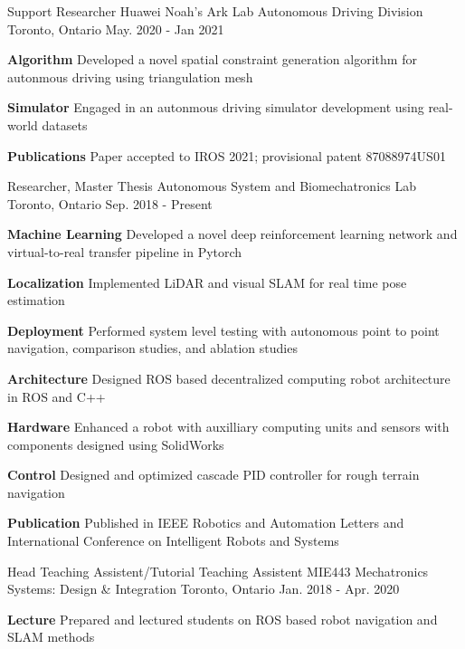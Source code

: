 \begin{cventries}
	\cventry
	{Support Researcher}
	{Huawei Noah’s Ark Lab Autonomous Driving Division}
	{Toronto, Ontario}
	{May. 2020 - Jan 2021}
	{
		\begin{cvitems}
			\item {
				\textbf{Algorithm} Developed a novel spatial constraint generation algorithm for autonmous driving using triangulation mesh
			}
			\item {
				\textbf{Simulator} Engaged in an autonmous driving simulator development using real-world datasets
			}
			\item{
				\textbf{Publications} Paper accepted to IROS 2021; provisional patent 87088974US01
			}
		\end{cvitems}
	}
	\cventry
	{Researcher, Master Thesis}
	{Autonomous System and Biomechatronics Lab}
	{Toronto, Ontario}
	{Sep. 2018 - Present}
	{
		\begin{cvitems}
			\item {
				\textbf{Machine Learning} Developed a novel deep reinforcement learning network and virtual-to-real transfer pipeline in Pytorch
			}
			\item {
				\textbf{Localization} Implemented LiDAR and visual SLAM for real time pose estimation
			}
			\item {
				\textbf{Deployment} Performed system level testing with autonomous point to point navigation, comparison studies, and ablation studies
			}
			\item {
				\textbf{Architecture} Designed ROS based decentralized computing robot architecture in ROS and C++
			}
			\item {
				\textbf{Hardware} Enhanced a robot with auxilliary computing units and sensors with components designed using SolidWorks
			}
			\item {
				\textbf{Control} Designed and optimized cascade PID controller for rough terrain navigation
			}
			\item {
				\textbf{Publication} Published in IEEE Robotics and Automation Letters and International Conference on Intelligent Robots and Systems
			}
		\end{cvitems}
	}
	\cventry
	{Head Teaching Assistent/Tutorial Teaching Assistent}
	{MIE443 Mechatronics Systems: Design \& Integration}
	{Toronto, Ontario}
	{Jan. 2018 - Apr. 2020}
	{
		\begin{cvitems}
			\item {
				\textbf{Lecture} Prepared and lectured students on ROS based robot navigation and SLAM methods
}
\end{cvitems}}
\end{cventries}
